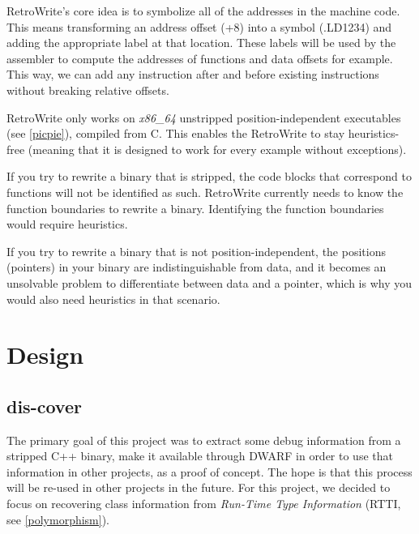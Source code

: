 \documentclass[a4paper,11pt,oneside]{report}
\begin{document}
RetroWrite's core idea is to symbolize all of the addresses in the machine
code. This means transforming an address offset (+8) into a symbol
(.LD1234) and adding the appropriate label at that location.
These labels will be used by the assembler to compute the addresses of
functions and data offsets for example.
This way, we can add any instruction after and before existing instructions
without breaking relative offsets.

RetroWrite only works on \emph{x86\_64} unstripped position-independent
executables (see \autoref{picpie}), compiled from C.
This enables the RetroWrite to stay heuristics-free (meaning that it is
designed to work for every example without exceptions).

If you try to rewrite a binary that is stripped, the code blocks that
correspond to functions will not be identified as such.
RetroWrite currently needs to know the function boundaries to rewrite a binary.
Identifying the function boundaries would require heuristics.

If you try to rewrite a binary that is not position-independent, the
positions (pointers) in your binary are indistinguishable from data, and it
becomes an unsolvable problem to differentiate between data and a pointer,
which is why you would also need heuristics in that scenario.


\chapter{Design}




\section{dis-cover}

The primary goal of this project was to extract some debug information from a
stripped C++ binary, make it available through DWARF in order to use that
information in other projects, as a proof of concept.
The hope is that this process will be re-used in other projects in the future.
For this project, we decided to focus on recovering class information from
\emph{Run-Time Type Information} (RTTI, see \autoref{polymorphism}).
\end{document}
